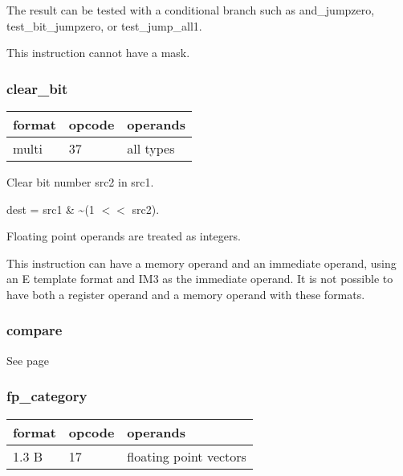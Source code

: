 \documentclass[forwardcom.tex]{subfiles}
\begin{document}
The result can be tested with a conditional branch such as and\_jumpzero, test\_bit\_jumpzero, or test\_jump\_all1.
\vspace{2mm}

This instruction cannot have a mask.

\subsubsection{clear\_bit}
\label{table:clearBitInstruction}
\begin{tabular}{|p{12mm}|p{12mm}|p{110mm}|}
\hline
\bfseries format & \bfseries opcode & \bfseries operands \\ \hline
multi & 37 & all types \\ \hline
\end{tabular}
\vspace{2mm}

Clear bit number src2 in src1.
\vspace{2mm}

dest = src1 \& \~{}(1 $<<$ src2).

\vspace{2mm}
Floating point operands are treated as integers.

\vspace{2mm}
This instruction can have a memory operand and an immediate operand, using an E template format and IM3  as the immediate operand. It is not possible to have both a register operand and a memory operand with these formats.
\vspace{2mm}

\subsubsection{compare}
See page \pageref{table:compareInstruction}
\vspace{2mm}

\subsubsection{fp\_category}
\label{table:fpCategoryInstruction}
\begin{tabular}{|p{12mm}|p{12mm}|p{110mm}|}
\hline
\bfseries format & \bfseries opcode & \bfseries operands \\ \hline
1.3 B & 17 & floating point vectors \\ \hline
\end{tabular}
\vspace{2mm}
\end{document}
